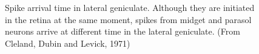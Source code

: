 \begin{figure}
\centerline {
}
\caption[Arrival Time of Retinal Ganglion Cell Spikes]{
Spike arrival time in lateral geniculate.
Although they are initiated in the retina at the same moment,
spikes from midget and parasol neurons arrive at different time
in the lateral geniculate.
(From Cleland, Dubin and Levick, 1971)
}
\label{f4:arrival.time}
\end{figure}

